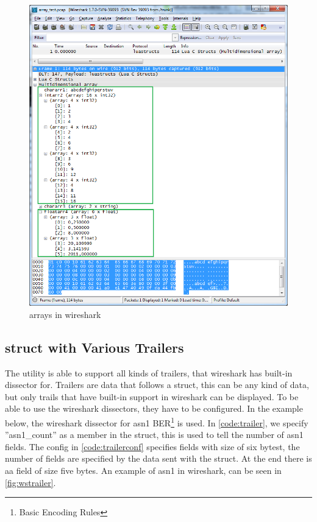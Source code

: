 \begin{figure}[ht]
	\center
	\includegraphics[width=\textwidth]{./sprints/img/wireshark_array}
	\caption{\Glspl{array} in \Gls{wireshark}\label{fig:wsarray}}
\end{figure}

\subsection{\Gls{struct} with Various Trailers}
The \gls{utility} is able to support all kinds of \gls{trailers}, that \Gls{wireshark} has 
built-in \gls{dissector} for. Trailers are data that follows a \gls{struct}, this can be 
any kind of data, but only trails that have built-in support in \Gls{wireshark} can 
be displayed.  To be able to use the \Gls{wireshark} \glspl{dissector}, they have to be 
configured. In the example below, the \Gls{wireshark} \gls{dissector} for \gls{asn1} 
BER\footnote{Basic Encoding Rules}  is used.  In \autoref{code:trailer}, we 
specify ''asn1\_count'' as a \gls{member} in the \gls{struct}, this is used to tell the 
number of \gls{asn1} fields. The config in  \autoref{code:trailerconf} specifies 
fields with size of six bytest, the number of fields are specified by the data 
sent with the \gls{struct}. At the end there is aa field of size five bytes. An 
example of \gls{asn1} in \Gls{wireshark}, can be seen in \autoref{fig:wstrailer}.

